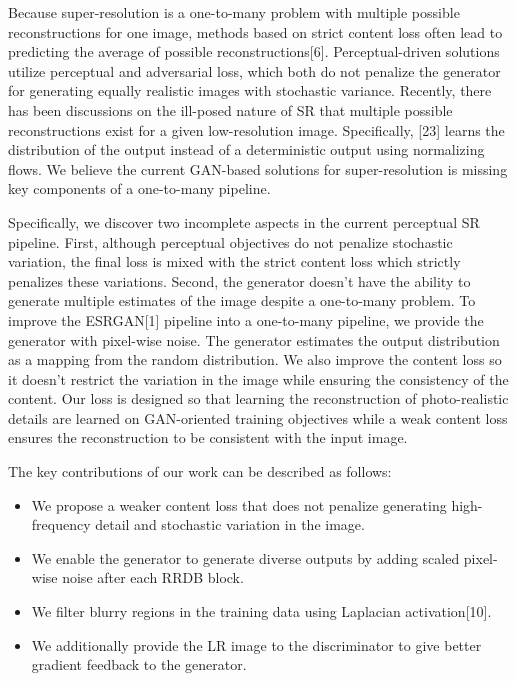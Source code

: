 \documentclass{article}
\begin{document}
Because super-resolution is a one-to-many problem with multiple possible reconstructions for one image, methods based on strict content loss often lead to predicting the average of possible reconstructions[6]. Perceptual-driven solutions utilize perceptual and adversarial loss, which both do not penalize the generator for generating equally realistic images with stochastic variance. Recently, there has been discussions on the ill-posed nature of SR that multiple possible reconstructions exist for a given low-resolution image. Specifically, [23] learns the distribution of the output instead of a deterministic output using normalizing flows. We believe the current GAN-based solutions for super-resolution is missing key components of a one-to-many pipeline. 

Specifically, we discover two incomplete aspects in the current perceptual SR pipeline. First, although perceptual objectives do not penalize stochastic variation, the final loss is mixed with the strict content loss which strictly penalizes these variations. Second, the generator doesn't have the ability to generate multiple estimates of the image despite a one-to-many problem. To improve the ESRGAN[1] pipeline into a one-to-many pipeline, we provide the generator with pixel-wise noise. The generator estimates the output distribution as a mapping from the random distribution. We also improve the content loss so it doesn't restrict the variation in the image while ensuring the consistency of the content. Our loss is designed so that learning the reconstruction of photo-realistic details are learned on GAN-oriented training objectives while a weak content loss ensures the reconstruction to be consistent with the input image. 


The key contributions of our work can be described as follows:

\begin{itemize}

\item We propose a weaker content loss that does not penalize generating high-frequency detail and stochastic variation in the image.

\item  We enable the generator to generate diverse outputs by adding scaled pixel-wise noise after each RRDB block.

\item  We filter blurry regions in the training data using Laplacian activation[10].

\item  We additionally provide the LR image to the discriminator to give better gradient feedback to the generator.

\end{itemize}
\end{document}

